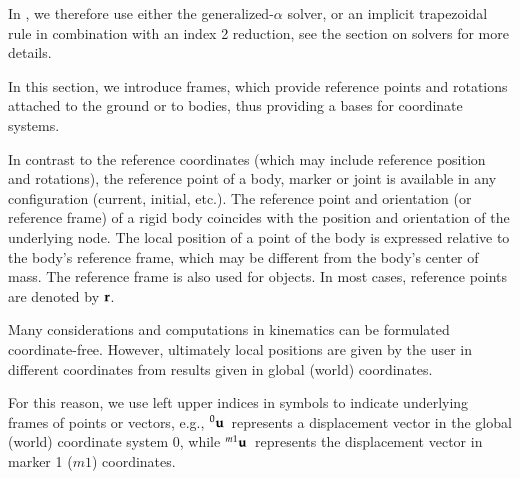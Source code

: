 \noindent In \codeName, we therefore use either the generalized-$\alpha$ solver, or an implicit trapezoidal rule in combination with an index 2
reduction, see the section on solvers for more details.

In this section, we introduce frames, which provide reference points and rotations attached to the ground or to bodies, thus providing a bases for coordinate systems.

%
In contrast to the reference coordinates (which may include reference position and rotations), the reference point of a body, marker or joint is available in any configuration (current, initial, etc.). 
The reference point and orientation (or reference frame) of a rigid body coincides with the position and orientation of the underlying node.
The local position of a point of the body is expressed relative to the body's reference frame, which may be different from the body's center of mass.
%
The reference frame is also used for  objects. In most cases, reference points are denoted by $\mathbf{r}$.

%
Many considerations and computations in kinematics can be formulated coordinate-free.
However, ultimately local positions are given by the user in different coordinates from results given in global (world) coordinates.

For this reason, we use left upper indices in symbols to indicate underlying frames of points or vectors, e.g.,
$\prescript{0}{}{\mathbf{u}}\,$ represents a displacement vector in the global (world) coordinate system $0$, while 
$\prescript{m1}{}{\mathbf{u}}\,$ represents the displacement vector in marker 1 ($m1$) coordinates. 

